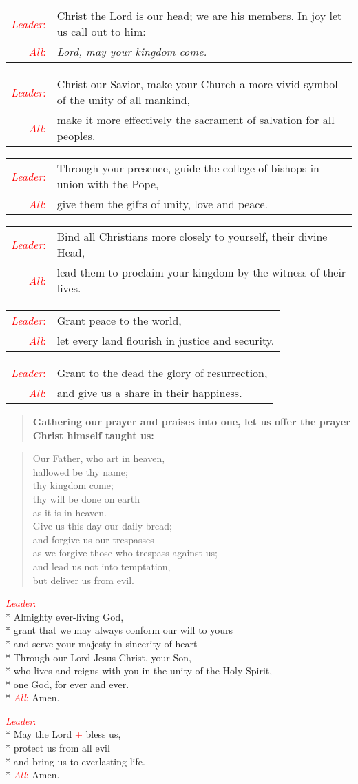 \documentclass[letterpaper,14pt]{extarticle}
\newcommand{\side}[1]{\flagverse{\textcolor{red}{\textit{#1}}:}}
\newcommand{\sidestar}[1]{\textcolor{red}{\textit{#1}:}}
\newcommand{\rednote}[1]{\textcolor{red}{#1}}
\newlength{\oldindent}
\newcommand{\antiphon}[2]{
	\setlength{\oldindent}{\vindent}
	\setlength{\vindent}{0em}
	\begin{verse}
	\side{#1} \textbf{#2}
	\end{verse}
	\setlength{\vindent}{\oldindent}
}
\newcommand{\intercession}[2]{
	\begin{tabular}[h]{r p{4.25in}}
		\sidestar{Leader} & #1 \\
		\sidestar{All} & #2
	\end{tabular}}
\begin{document}
\intercession{Christ the Lord is our head; we are his members. In joy let us call out to him:}
{\textit{Lord, may your kingdom come.}}

\intercession{Christ our Savior, make your Church a more vivid symbol of the unity of all mankind,}
{make it more effectively the sacrament of salvation for all peoples.}

\intercession{Through your presence, guide the college of bishops in union with the Pope,}
{give them the gifts of unity, love and peace.}

\intercession{Bind all Christians more closely to yourself, their divine Head,}
{lead them to proclaim your kingdom by the witness of their lives.}

\intercession{Grant peace to the world,}
{let every land flourish in justice and security.}

\intercession{Grant to the dead the glory of resurrection,}
{and give us a share in their happiness.}

\antiphon{Leader}{Gathering our prayer and praises into one, let us offer the
prayer Christ himself taught us:}
\begin{verse}
\side{All} Our Father, who art in heaven, \\
hallowed be thy name; \\
thy kingdom come; \\
thy will be done on earth \\
as it is in heaven. \\
Give us this day our daily bread; \\
and forgive us our trespasses \\
as we forgive those who trespass against us; \\
and lead us not into temptation, \\
but deliver us from evil.
\end{verse}

\sidestar{Leader}\\*
Almighty ever-living God, \\*
grant that we may always conform our will to yours\\*
and serve your majesty in sincerity of heart\\*
Through our Lord Jesus Christ, your Son, \\*
who lives and reigns with you in the unity of the Holy Spirit, \\*
one God, for ever and ever. \\*
\sidestar{All} Amen.


\sidestar{Leader}\\*
May the Lord \rednote{+} bless us, \\*
protect us from all evil \\*
and bring us to everlasting life. \\*
\sidestar{All} Amen.
\end{document}
